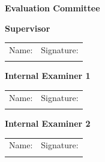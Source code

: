 \clearpage
\begin{center}
    \textbf{\LARGE Evaluation Committee}
\end{center}

\vspace{1.7cm}

\begin{center}
    \begin{framed}
        \textbf{Supervisor} \\
        \vspace{0.7cm}
        \begin{tabular}{@{}p{}p{}@{}}
            Name: \underline{\hspace{6cm}} & Signature: \underline{\hspace{5cm}} \\
            \vspace{0.2cm}
        \end{tabular}
    \end{framed}

    \vspace{1cm}

    \begin{framed}
        \textbf{Internal Examiner 1} \\
        \vspace{0.7cm}
        \begin{tabular}{@{}p{}p{}@{}}
            Name: \underline{\hspace{6cm}} & Signature: \underline{\hspace{5cm}} \\
            \vspace{0.2cm}
        \end{tabular}
    \end{framed}

    \vspace{1cm}

    \begin{framed}
        \textbf{Internal Examiner 2} \\
        \vspace{0.7cm}
        \begin{tabular}{@{}p{}p{}@{}}
            Name: \underline{\hspace{6cm}} & Signature: \underline{\hspace{5cm}} \\
            \vspace{0.2cm}
        \end{tabular}
    \end{framed}


\end{center}
